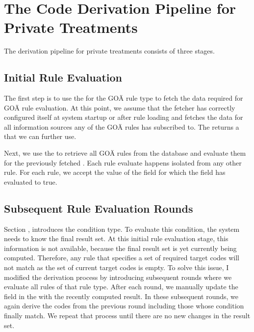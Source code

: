 \section{The Code Derivation Pipeline for Private Treatments}\label{sec:the-code-derivation-pipeline-for-private-treatments}

The derivation pipeline for private treatments consists of three stages.

\subsection{Initial Rule Evaluation}\label{subsec:rule-evaluation-stage}

The first step is to use the \REIF for the GOÄ rule type to fetch the data required for GOÄ rule evaluation.
At this point,
we assume that the fetcher has correctly configured itself at system startup or after rule loading
and fetches the data for all information sources any of the GOÄ rules has subscribed to.
The \REIF returns a \REI that we can further use.

Next, we use the  to retrieve all GOÄ rules from the database and evaluate them for the previously fetched \REI.
Each rule evaluate happens isolated from any other rule.
For each rule, we accept the value of the  field for which the  field has evaluated to true.

\subsection{Subsequent Rule Evaluation Rounds}\label{subsec:rule-evaluation-rounds}

Section \addref, introduces the  condition type.
To evaluate this condition, the system needs to know the final result set.
At this initial rule evaluation stage, this information is not available, because the final result set is yet currently being computed.
Therefore, any rule that specifies a set of required target codes will not match as the set of current target codes is empty.
To solve this issue,
I modified the derivation process by introducing subsequent rounds where we evaluate all rules of that rule type.
After each round, we manually update the  field in the \REI with the recently computed result.
In these subsequent rounds, we again derive the codes from the previous round including those whose  condition finally match.
We repeat that process until there are no new changes in the result set.

